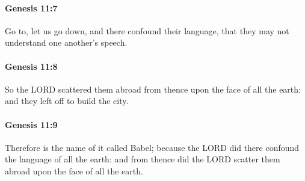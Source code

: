 		\paragraph{Genesis 11:7} %
			\label{GENESIS-11-7}

			Go to, let us go down, and there confound their language, that they may not understand one another's speech.


		\paragraph{Genesis 11:8} %
			\label{GENESIS-11-8}

			So the LORD scattered them abroad from thence upon the face of all the earth: and they left off to build the city.


		\paragraph{Genesis 11:9} %
			\label{GENESIS-11-9}

			Therefore is the name of it called Babel; because the LORD did there confound the language of all the earth: and from thence did the LORD scatter them abroad upon the face of all the earth.


